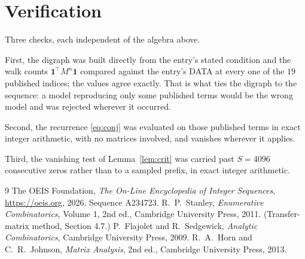 \documentclass[11pt,a4paper]{article}
\theoremstyle{plain}
\theoremstyle{definition}
\begin{document}
\section{Verification}

Three checks, each independent of the algebra above.

First, the digraph was built directly from the entry's stated condition and the walk counts
$\mathbf{1}^{\!\top}M^{n}\mathbf{1}$ compared against the entry's DATA at every one of
the $19$ published indices; the values agree exactly. That is what ties the digraph to
the sequence: a model reproducing only some published terms would be the wrong model and
was rejected wherever it occurred.

Second, the recurrence \eqref{eq:conj} was evaluated on those published terms in exact
integer arithmetic, with no matrices involved, and vanishes wherever it applies.

Third, the vanishing test of Lemma~\ref{lem:crit} was carried past $S=4096$ consecutive
zeros rather than to a sampled prefix, in exact integer arithmetic.

\begin{thebibliography}{9}
 The OEIS Foundation, \emph{The On-Line Encyclopedia of Integer
Sequences}, \url{https://oeis.org}, 2026. Sequence A234723.
 R.~P.~Stanley, \emph{Enumerative Combinatorics}, Volume 1, 2nd ed.,
Cambridge University Press, 2011. (Transfer-matrix method, Section 4.7.)
 P.~Flajolet and R.~Sedgewick, \emph{Analytic Combinatorics}, Cambridge
University Press, 2009.
 R.~A.~Horn and C.~R.~Johnson, \emph{Matrix Analysis}, 2nd ed., Cambridge
University Press, 2013.
\end{thebibliography}
\end{document}
